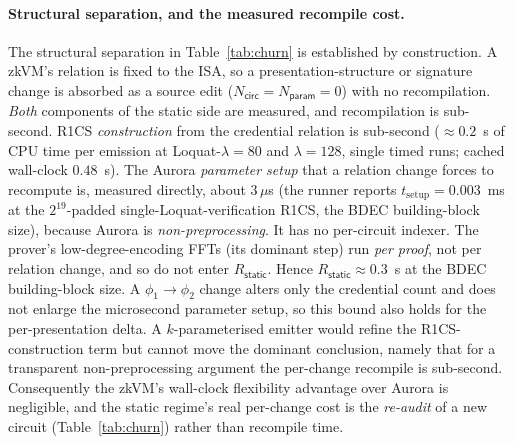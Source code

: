 \paragraph{Structural separation, and the measured recompile cost.}
The structural separation in Table~\ref{tab:churn} is established by construction. A zkVM's relation is fixed to the ISA, so a presentation-structure or signature change is absorbed as a source edit ($N_{\mathsf{circ}}=N_{\mathsf{param}}=0$) with no recompilation. \emph{Both} components of the static side are measured, and recompilation is sub-second. R1CS \emph{construction} from the credential relation is sub-second (${\approx}0.2$~s of CPU time per emission at Loquat-$\lambda{=}80$ and $\lambda{=}128$, single timed runs; cached wall-clock $0.48$~s). The Aurora \emph{parameter setup} that a relation change forces to recompute is, measured directly, about $3\,\mu$s (the runner reports $t_{\mathrm{setup}}=0.003$~ms at the $2^{19}$-padded single-Loquat-verification R1CS, the BDEC building-block size), because Aurora is \emph{non-preprocessing}. It has no per-circuit indexer. The prover's low-degree-encoding FFTs (its dominant step) run \emph{per proof}, not per relation change, and so do not enter $R_{\mathsf{static}}$. Hence $R_{\mathsf{static}}\approx 0.3$~s at the BDEC building-block size. A $\phi_1\!\to\!\phi_2$ change alters only the credential count and does not enlarge the microsecond parameter setup, so this bound also holds for the per-presentation delta. A $k$-parameterised emitter would refine the R1CS-construction term but cannot move the dominant conclusion, namely that for a transparent non-preprocessing argument the per-change recompile is sub-second. Consequently the zkVM's wall-clock flexibility advantage over Aurora is negligible, and the static regime's real per-change cost is the \emph{re-audit} of a new circuit (Table~\ref{tab:churn}) rather than recompile time.

